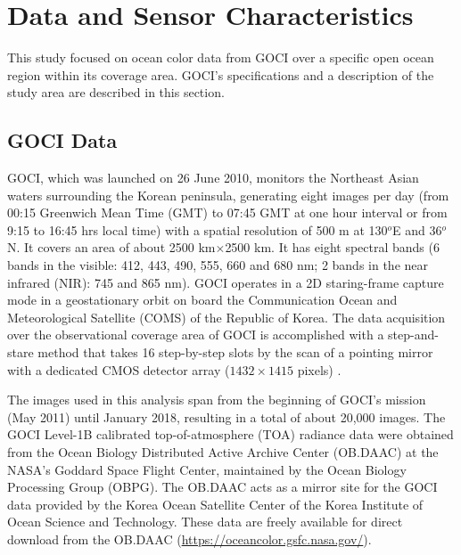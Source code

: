 \documentclass[remotesensing,article,submit,moreauthors,pdftex,10pt,a4paper]{Definitions/mdpi}
\begin{document}

\section{Data and Sensor Characteristics}
This study focused on ocean color data from GOCI over a specific open ocean region within its coverage area. GOCI’s specifications and a description of the study area are described in this section.
\subsection{GOCI Data}
GOCI, which was launched on 26 June 2010, monitors the Northeast Asian waters surrounding the Korean peninsula, generating eight images per day (from 00:15 Greenwich Mean Time (GMT) to 07:45 GMT at one hour interval or from 9:15 to 16:45 hrs local time) with a spatial resolution of 500 m at 130$^o$E and 36$^o$N. It covers an area of about 2500 km$\times$2500 km. It has eight spectral bands (6 bands in the visible: 412, 443, 490, 555, 660 and 680 nm; 2 bands in the near infrared (NIR): 745 and 865 nm). GOCI operates in a 2D staring-frame capture mode in a geostationary orbit on board the Communication Ocean and Meteorological Satellite (COMS) of the Republic of Korea. The data acquisition over the observational coverage area of GOCI is accomplished with a step-and-stare method that takes 16 step-by-step slots by the scan of a pointing mirror with a dedicated CMOS detector array ($1432\times1415$ pixels) \cite{Kang2010}. 

The images used in this analysis span from the beginning of GOCI's mission (May 2011) until January 2018, resulting in a total of about 20,000 images. The GOCI Level-1B calibrated top-of-atmosphere (TOA) radiance data were obtained from the Ocean Biology Distributed Active Archive Center (OB.DAAC) at the NASA's Goddard Space Flight Center, maintained by the Ocean Biology Processing Group (OBPG). The OB.DAAC acts as a mirror site for the GOCI data provided by the Korea Ocean Satellite Center of the Korea Institute of Ocean Science and Technology. These data are freely available for direct download from the OB.DAAC (\url{https://oceancolor.gsfc.nasa.gov/}). 
\end{document}
